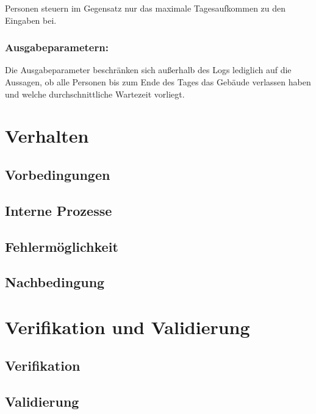\documentclass[
]{book}
\begin{document}
Personen steuern im Gegensatz nur das maximale Tagesaufkommen zu den
Eingaben bei.

\hypertarget{ausgabeparametern}{%
\subsection{Ausgabeparametern:}\label{ausgabeparametern}}

Die Ausgabeparameter beschränken sich außerhalb des Logs lediglich auf
die Aussagen, ob alle Personen bis zum Ende des Tages das Gebäude
verlassen haben und welche durchschnittliche Wartezeit vorliegt.

\hypertarget{verhalten}{%
\chapter{Verhalten}\label{verhalten}}

\hypertarget{vorbedingungen}{%
\section{Vorbedingungen}\label{vorbedingungen}}

\hypertarget{interne-prozesse}{%
\section{Interne Prozesse}\label{interne-prozesse}}

\hypertarget{fehlermuxf6glichkeit}{%
\section{Fehlermöglichkeit}\label{fehlermuxf6glichkeit}}

\hypertarget{nachbedingung}{%
\section{Nachbedingung}\label{nachbedingung}}

\hypertarget{verifikation-und-validierung}{%
\chapter{Verifikation und
Validierung}\label{verifikation-und-validierung}}

\hypertarget{verifikation}{%
\section{Verifikation}\label{verifikation}}

\hypertarget{validierung}{%
\section{Validierung}\label{validierung}}

\backmatter
\end{document}
